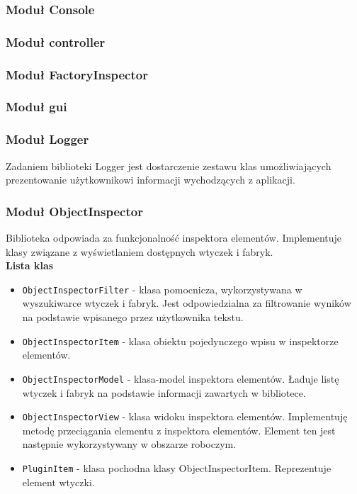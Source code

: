 \documentclass[12pt]{article}
\begin{document}
\subsubsection{Moduł Console}
\subsubsection{Moduł controller}
\subsubsection{Moduł FactoryInspector}
\subsubsection{Moduł gui}
\subsubsection{Moduł Logger}
Zadaniem biblioteki Logger jest dostarczenie zestawu klas umożliwiających prezentowanie użytkownikowi informacji wychodzących z aplikacji.
\subsubsection{Moduł ObjectInspector}
Biblioteka odpowiada za funkcjonalność inspektora elementów. Implementuje klasy związane z wyświetlaniem dostępnych wtyczek i fabryk.\\
\textbf{Lista klas}
\begin{itemize}
  \setlength{\itemsep}{0em}
\item \texttt{ObjectInspectorFilter} - klasa pomocnicza, wykorzystywana w wyszukiwarce wtyczek i fabryk. Jest odpowiedzialna za filtrowanie wyników na podstawie wpisanego przez użytkownika tekstu.
\item \texttt{ObjectInspectorItem} - klasa obiektu pojedynczego wpisu w inspektorze elementów. 
\item \texttt{ObjectInspectorModel} - klasa-model inspektora elementów. Ładuje listę wtyczek i fabryk na podstawie informacji zawartych w bibliotece.
\item \texttt{ObjectInspectorView} - klasa widoku inspektora elementów. Implementuję metodę przeciągania elementu z inspektora elementów. Element ten jest następnie wykorzystywany w obszarze roboczym.
\item \texttt{PluginItem} - klasa pochodna klasy ObjectInspectorItem. Reprezentuje element wtyczki.
\end{itemize}  
\end{document}
